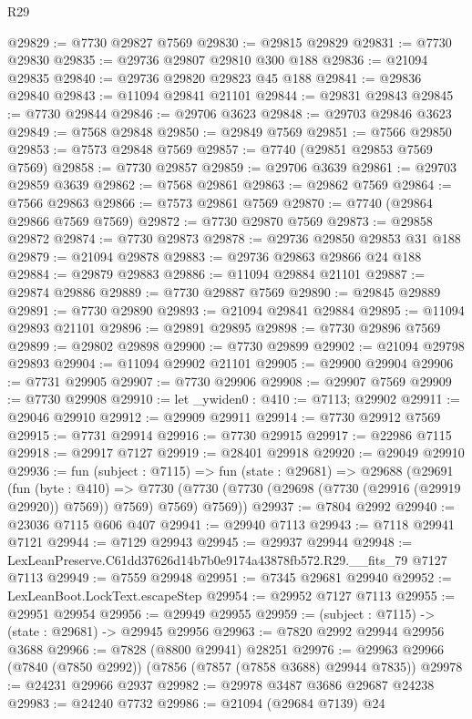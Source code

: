 \begin{lexlean}{R29}
\begin{coremodule}
@29829 := @7730 @29827 @7569
@29830 := @29815 @29829
@29831 := @7730 @29830
@29835 := @29736 @29807 @29810 @300 @188
@29836 := @21094 @29835
@29840 := @29736 @29820 @29823 @45 @188
@29841 := @29836 @29840
@29843 := @11094 @29841 @21101
@29844 := @29831 @29843
@29845 := @7730 @29844
@29846 := @29706 @3623
@29848 := @29703 @29846 @3623
@29849 := @7568 @29848
@29850 := @29849 @7569
@29851 := @7566 @29850
@29853 := @7573 @29848 @7569
@29857 := @7740 (@29851 @29853 @7569 @7569)
@29858 := @7730 @29857
@29859 := @29706 @3639
@29861 := @29703 @29859 @3639
@29862 := @7568 @29861
@29863 := @29862 @7569
@29864 := @7566 @29863
@29866 := @7573 @29861 @7569
@29870 := @7740 (@29864 @29866 @7569 @7569)
@29872 := @7730 @29870 @7569
@29873 := @29858 @29872
@29874 := @7730 @29873
@29878 := @29736 @29850 @29853 @31 @188
@29879 := @21094 @29878
@29883 := @29736 @29863 @29866 @24 @188
@29884 := @29879 @29883
@29886 := @11094 @29884 @21101
@29887 := @29874 @29886
@29889 := @7730 @29887 @7569
@29890 := @29845 @29889
@29891 := @7730 @29890
@29893 := @21094 @29841 @29884
@29895 := @11094 @29893 @21101
@29896 := @29891 @29895
@29898 := @7730 @29896 @7569
@29899 := @29802 @29898
@29900 := @7730 @29899
@29902 := @21094 @29798 @29893
@29904 := @11094 @29902 @21101
@29905 := @29900 @29904
@29906 := @7731 @29905
@29907 := @7730 @29906
@29908 := @29907 @7569
@29909 := @7730 @29908
@29910 := let _ywiden0 : @410 := @7113; @29902
@29911 := @29046 @29910
@29912 := @29909 @29911
@29914 := @7730 @29912 @7569
@29915 := @7731 @29914
@29916 := @7730 @29915
@29917 := @22986 @7115
@29918 := @29917 @7127
@29919 := @28401 @29918
@29920 := @29049 @29910
@29936 := fun (subject : @7115) =>
  fun (state : @29681) =>
  @29688
    (@29691
      (fun (byte : @410) =>
      @7730 (@7730 (@7730 (@29698 (@7730 (@29916 (@29919 @29920)) @7569)) @7569) @7569) @7569))
@29937 := @7804 @2992
@29940 := @23036 @7115 @606 @407
@29941 := @29940 @7113
@29943 := @7118 @29941 @7121
@29944 := @7129 @29943
@29945 := @29937 @29944
@29948 := LexLeanPreserve.C61dd37626d14b7b0e9174a43878fb572.R29.__fits_79 @7127 @7113
@29949 := @7559 @29948
@29951 := @7345 @29681 @29940
@29952 := LexLeanBoot.LockText.escapeStep
@29954 := @29952 @7127 @7113
@29955 := @29951 @29954
@29956 := @29949 @29955
@29959 := (subject : @7115) -> (state : @29681) -> @29945 @29956
@29963 := @7820 @2992 @29944 @29956 @3688
@29966 := @7828 (@8800 @29941) @28251
@29976 := @29963 @29966 (@7840 (@7850 @2992)) (@7856 (@7857 (@7858 @3688) @29944 @7835))
@29978 := @24231 @29966 @2937
@29982 := @29978 @3487 @3686 @29687 @24238
@29983 := @24240 @7732
@29986 := @21094 (@29684 @7139) @24

\end{coremodule}
\end{lexlean}
